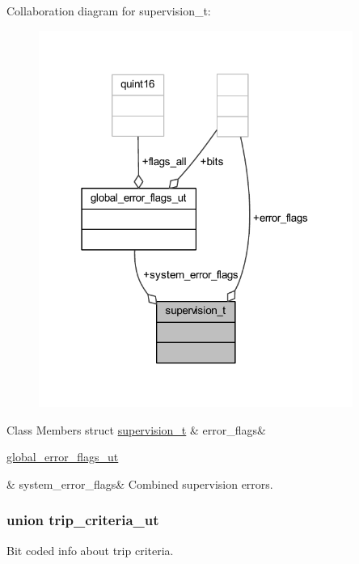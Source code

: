 Collaboration diagram for supervision\+\_\+t\+:
\nopagebreak
\begin{figure}[H]
\begin{center}
\leavevmode
\includegraphics[width=291pt]{df/d24/a00217}
\end{center}
\end{figure}
\begin{DoxyFields}{Class Members}
\hypertarget{a00003_a480b184a5fd0c97b16550ac26640d1f0}{struct \hyperlink{a00003_d0/d5e/a00136}{supervision\+\_\+t}}\label{a00003_a480b184a5fd0c97b16550ac26640d1f0}
&
error\+\_\+flags&
\\
\hline

\hypertarget{a00003_a7294ffc170c17b91f442d03081cb69fe}{\hyperlink{a00003_db/df8/a00076}{global\+\_\+error\+\_\+flags\+\_\+ut}}\label{a00003_a7294ffc170c17b91f442d03081cb69fe}
&
system\+\_\+error\+\_\+flags&
Combined supervision errors. \\
\hline

\end{DoxyFields}
\label{de/d14/a00139}
\hypertarget{a00003_de/d14/a00139}{}
\subsubsection{union trip\+\_\+criteria\+\_\+ut}
Bit coded info about trip criteria. 

